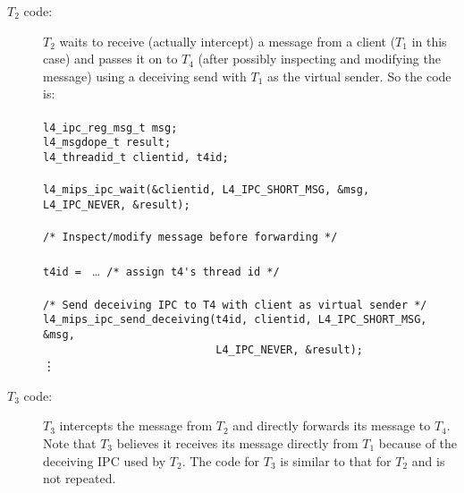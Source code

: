 \begin{description}
\item[$T_2$ code:]
  $T_2$ waits to receive (actually intercept) a message from a client 
  ($T_1$ in this case)
  and passes it on to $T_4$ (after possibly inspecting and modifying 
  the message) using a deceiving send with $T_1$ as the virtual sender. 
  So the code is: \\ \\
  \hspace*{10pt} {\footnotesize\verb+l4_ipc_reg_msg_t msg;+} \\
  \hspace*{10pt} {\footnotesize\verb+l4_msgdope_t result;+} \\
  \hspace*{10pt} {\footnotesize\verb+l4_threadid_t clientid, t4id;+} \\ \\
  \hspace*{10pt} {\footnotesize\verb+l4_mips_ipc_wait(&clientid, L4_IPC_SHORT_MSG, &msg, L4_IPC_NEVER, &result);+} \\ \\
  \hspace*{10pt} {\footnotesize\verb+/* Inspect/modify message before forwarding */+}\\ \\
  \hspace*{10pt} {\footnotesize\verb+t4id = +} \dots {\footnotesize\verb+ /* assign t4's thread id */+}\\ \\
  \hspace*{15pt} {\footnotesize\verb+/* Send deceiving IPC to T4 with client as virtual sender */+} \\
  \hspace*{10pt} {\footnotesize\verb+l4_mips_ipc_send_deceiving(t4id, clientid, L4_IPC_SHORT_MSG, &msg,+} \\
  \hspace*{10pt} {\footnotesize\verb+                           L4_IPC_NEVER, &result);+} \\ 
  \hspace*{40pt} \vdots   
  
\item[$T_3$ code:]
  $T_3$ intercepts the message from $T_2$ and directly forwards its 
  message to $T_4$. Note that $T_3$ believes it receives its message 
  directly from $T_1$ because of the deceiving IPC used by $T_2$.
  The code for $T_3$ is similar to that for $T_2$ and is not repeated.
  

\end{description}
